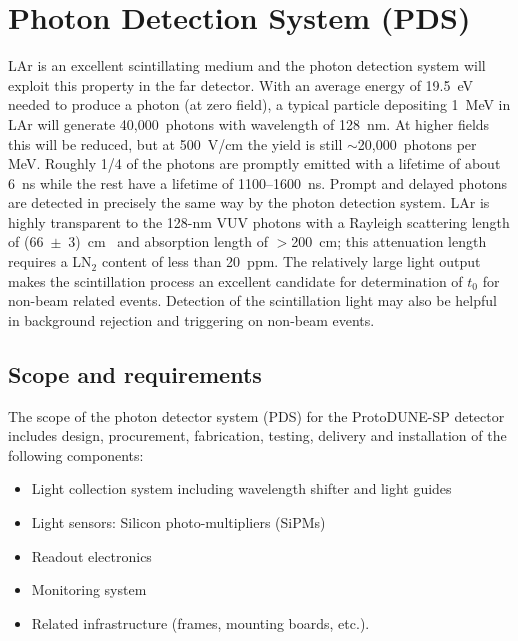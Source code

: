 
\section{Photon Detection System (PDS)}
\label{sec:pd_system}

LAr is an excellent scintillating medium and the photon detection
system will exploit this property in the far detector.  With an
average energy of 19.5~eV needed to produce a photon (at zero field),
a typical particle depositing 1~MeV in LAr will generate
40,000~photons with wavelength of 128~nm. At higher fields this will
be reduced, but at 500~V/cm the yield is still $\sim$20,000~photons
per MeV. Roughly 1/4 of the photons are promptly emitted with a
lifetime of about 6~ns while the rest have a lifetime of
1100--1600~ns. Prompt and delayed photons are detected in
  precisely the same way by the photon detection system. LAr is
highly transparent to the 128-nm VUV photons with a Rayleigh
scattering length of (66~$\pm$~3)~cm~\cite{Rayleigh} and absorption
length of $>$200~cm; this attenuation length requires a LN$_2$
  content of less than 20~ppm. The relatively large light output makes
the scintillation process an excellent candidate for determination of
$t_0$ for non-beam related events. Detection of the scintillation
light may also be helpful in background rejection and triggering on
non-beam events.

\subsection{Scope and requirements}

The scope of the photon detector system (PDS) for the ProtoDUNE-SP detector
includes design, procurement, fabrication,
testing, delivery and installation of the following components:
\begin{itemize}
\item Light collection system including wavelength shifter and light guides
\item Light sensors: Silicon photo-multipliers (SiPMs)
\item Readout electronics
\item Monitoring system
\item Related infrastructure (frames, mounting boards, etc.).
\end{itemize}

